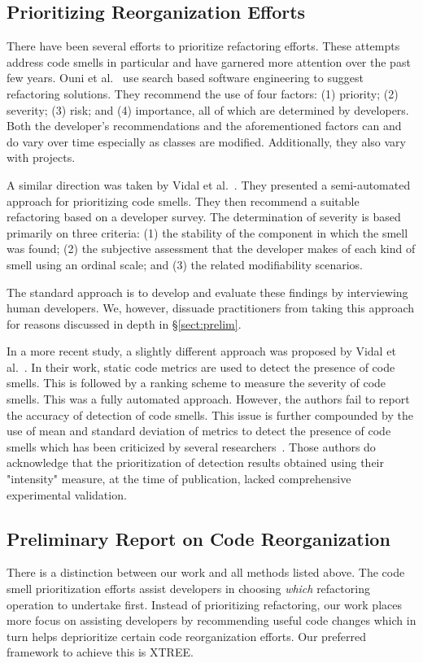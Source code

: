 \documentclass[twocolumn,5p]{elsarticle}
\newcommand{\tion}[1]{\S\ref{sect:#1}}
\theoremstyle{break}
\begin{document}
	{\color{steel}	
	\subsection{Prioritizing Reorganization Efforts}
	\label{sect:prior}

		There have been several efforts to prioritize refactoring efforts. 
		These attempts address code smells in particular and have garnered more 
		attention over the past few years. Ouni et al.~\cite{ouni3,ouni1,ouni2} 
		use search 
		based software engineering to suggest refactoring solutions. They 
		recommend the use of four 
		factors: (1) priority; (2) severity; (3) risk; and (4) importance, all 
		of which are determined by developers. Both the developer's 
		recommendations and the aforementioned factors can and do vary over 
		time especially as classes are modified. Additionally, they also vary 
		with projects. 
		
		A similar direction was taken by Vidal et al.~\cite{vidal14}. They 
		presented a semi-automated approach for prioritizing code smells. They 
		then recommend a suitable refactoring based on a developer survey. The 
		determination of severity is based primarily on three criteria: (1) the 
		stability of the component in which the smell was found; (2) the 
		subjective assessment that the developer makes of each kind of smell 
		using an ordinal scale; and (3) the related modifiability scenarios.
		
		The standard approach is to develop and evaluate these findings by 
		interviewing human developers. We, however, dissuade practitioners 
		from taking this approach for reasons discussed in depth in 
		\tion{prelim}.
		
		In a more recent study, a slightly different approach was proposed by 
		Vidal et al.~\cite{font1}. In their work, static code metrics are used 
		to detect the presence of code smells. This is followed by a ranking 
		scheme to measure the severity of code smells. This was a fully 
		automated approach. However, the authors fail to report the accuracy 
		of 
		detection of code smells. This issue is further compounded by the use 
		of mean and standard deviation of metrics to detect the presence of 
		code smells which has been criticized by several  
		researchers~\cite{Shatnawi10,Alves2010}. Those authors do acknowledge 
		that the prioritization of detection results obtained using their 
		"intensity" measure, at the time of publication, lacked comprehensive 
		experimental validation.
		
		
		\subsection{Preliminary Report on Code Reorganization}
		There is a distinction between our work and all methods listed above. 
		The code smell prioritization efforts assist developers in choosing 
		\textit{which} refactoring operation to undertake first. Instead of 
		prioritizing refactoring, our work places more focus on assisting 
		developers by recommending useful code changes which in turn helps 
		deprioritize certain code reorganization efforts. Our preferred 
		framework 
		to 
		achieve this is XTREE.}
	
\end{document}
